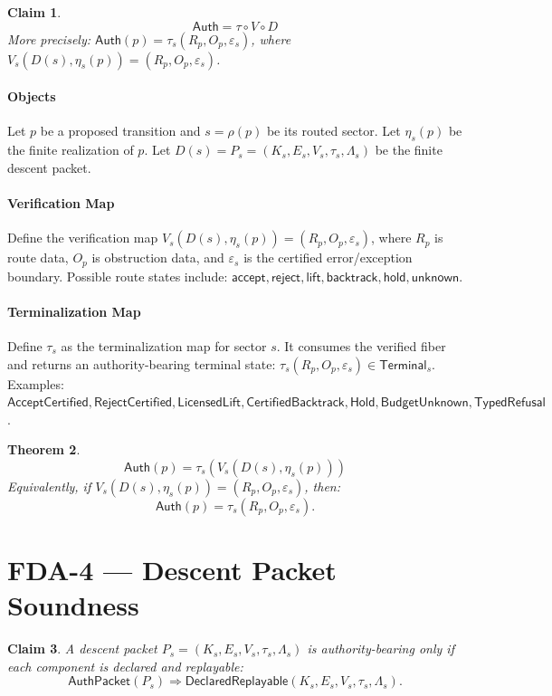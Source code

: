 \documentclass[11pt]{article}
\newtheorem{theorem}{Theorem}[section]
\newtheorem{claim}[theorem]{Claim}
\begin{document}
\begin{claim}
\[
\boxed{\mathsf{Auth}=\tau\circ V\circ D}
\]
More precisely: \(\mathsf{Auth}(p)=\tau_s(R_p,O_p,\varepsilon_s)\), where \(V_s(D(s),\eta_s(p))=(R_p,O_p,\varepsilon_s)\).
\end{claim}

\paragraph{Objects}
Let \(p\) be a proposed transition and \(s=\rho(p)\) be its routed sector. Let \(\eta_s(p)\) be the finite realization of \(p\). Let \(D(s) = P_s = (K_s,E_s,V_s,\tau_s,\Lambda_s)\) be the finite descent packet.

\paragraph{Verification Map}
Define the verification map \(V_s(D(s),\eta_s(p)) = (R_p,O_p,\varepsilon_s)\), where \(R_p\) is route data, \(O_p\) is obstruction data, and \(\varepsilon_s\) is the certified error/exception boundary. Possible route states include: \(\mathsf{accept}, \mathsf{reject}, \mathsf{lift}, \mathsf{backtrack}, \mathsf{hold}, \mathsf{unknown}\).

\paragraph{Terminalization Map}
Define \(\tau_s\) as the terminalization map for sector \(s\). It consumes the verified fiber and returns an authority-bearing terminal state: \(\tau_s(R_p,O_p,\varepsilon_s) \in \mathsf{Terminal}_s\). Examples: \(\mathsf{AcceptCertified}, \mathsf{RejectCertified}, \mathsf{LicensedLift}, \mathsf{CertifiedBacktrack}, \mathsf{Hold}, \mathsf{BudgetUnknown}, \mathsf{TypedRefusal}\).

\begin{theorem}
\[
\boxed{
\mathsf{Auth}(p) = \tau_s(V_s(D(s),\eta_s(p)))
}
\]
Equivalently, if \(V_s(D(s),\eta_s(p)) = (R_p,O_p,\varepsilon_s)\), then:
\[
\boxed{
\mathsf{Auth}(p) = \tau_s(R_p,O_p,\varepsilon_s).
}
\]
\end{theorem}

\section{FDA-4 — Descent Packet Soundness}

\begin{claim}
A descent packet \(P_s=(K_s,E_s,V_s,\tau_s,\Lambda_s)\) is authority-bearing only if each component is declared and replayable:
\[
\boxed{
\mathsf{AuthPacket}(P_s) \Rightarrow \mathsf{DeclaredReplayable}(K_s,E_s,V_s,\tau_s,\Lambda_s).
}
\]
\end{claim}
\end{document}
